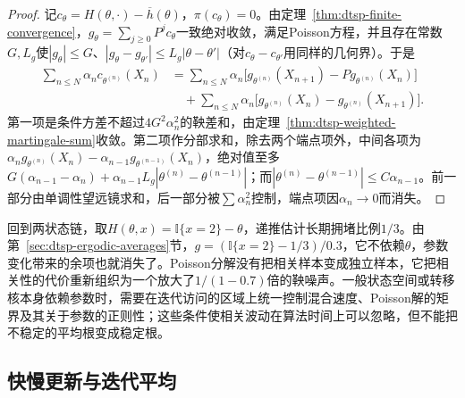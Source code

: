 \begin{proof}
记$c_\theta=H(\theta,\cdot)-\overline h(\theta)$，$\pi(c_\theta)=0$。由定理~\ref{thm:dtsp-finite-convergence}，$g_\theta=\sum_{j\geq0}P^jc_\theta$一致绝对收敛，满足Poisson方程，并且存在常数$G,L_g$使$|g_\theta|\leq G$、$|g_\theta-g_{\theta'}|\leq L_g|\theta-\theta'|$（对$c_\theta-c_{\theta'}$用同样的几何界）。于是
\[
  \begin{aligned}
    \sum_{n\leq N}\alpha_nc_{\theta^{(n)}}(X_n)&=\sum_{n\leq N}\alpha_n\bigl[g_{\theta^{(n)}}(X_{n+1})-Pg_{\theta^{(n)}}(X_n)\bigr]\\
    &\quad+\sum_{n\leq N}\alpha_n\bigl[g_{\theta^{(n)}}(X_n)-g_{\theta^{(n)}}(X_{n+1})\bigr].
  \end{aligned}
\]
第一项是条件方差不超过$4G^2\alpha_n^2$的鞅差和，由定理~\ref{thm:dtsp-weighted-martingale-sum}收敛。第二项作分部求和，除去两个端点项外，中间各项为$\alpha_ng_{\theta^{(n)}}(X_n)-\alpha_{n-1}g_{\theta^{(n-1)}}(X_n)$，绝对值至多$G(\alpha_{n-1}-\alpha_n)+\alpha_{n-1}L_g|\theta^{(n)}-\theta^{(n-1)}|$；而$|\theta^{(n)}-\theta^{(n-1)}|\leq C\alpha_{n-1}$。前一部分由单调性望远镜求和，后一部分被$\sum\alpha_n^2$控制，端点项因$\alpha_n\to0$而消失。
\end{proof}

回到两状态链，取$H(\theta,x)=\mathbb I\{x=2\}-\theta$，递推估计长期拥堵比例$1/3$。由第~\ref{sec:dtsp-ergodic-averages}节，$g=(\mathbb I\{x=2\}-1/3)/0.3$，它不依赖$\theta$，参数变化带来的余项也就消失了。Poisson分解没有把相关样本变成独立样本，它把相关性的代价重新组织为一个放大了$1/(1-0.7)$倍的鞅噪声。一般状态空间或转移核本身依赖参数时，需要在迭代访问的区域上统一控制混合速度、Poisson解的矩界及其关于参数的正则性；这些条件使相关波动在算法时间上可以忽略，但不能把不稳定的平均根变成稳定根。

\subsection{快慢更新与迭代平均}
\label{sec:dtsp-two-timescale}

